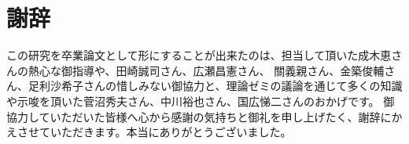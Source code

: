 
\section{謝辞}
この研究を卒業論文として形にすることが出来たのは、担当して頂いた成木恵さんの熱心な御指導や、田崎誠司さん、広瀬昌憲さん、
關義親さん、金築俊輔さん、足利沙希子さんの惜しみない御協力と、理論ゼミの議論を通じて多くの知識や示唆を頂いた菅沼秀夫さん、中川裕也さん、国広悌二さんのおかげです。
御協力していただいた皆様へ心から感謝の気持ちと御礼を申し上げたく、謝辞にかえさせていただきます。本当にありがとうございました。

